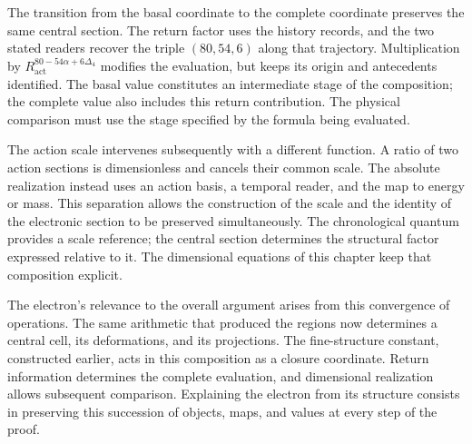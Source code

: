 The transition from the basal coordinate to the complete coordinate preserves
the same central section. The return factor uses the history
records, and the two stated readers recover the triple
$(80,54,6)$ along that trajectory. Multiplication by
$R_{\mathrm{act}}^{80-54\alpha+6\Delta_4}$ modifies the evaluation,
but keeps its origin and antecedents identified. The basal
value constitutes an intermediate stage of the composition; the complete
value also includes this return contribution. The physical
comparison must use the stage specified by the formula being evaluated.

The action scale intervenes subsequently with a different function. A ratio of
two action sections is dimensionless and cancels their common scale.
The absolute realization instead uses an action basis, a
temporal reader, and the map to energy or mass. This separation allows
the construction of the scale and the identity of the electronic section
to be preserved simultaneously. The chronological quantum provides a
scale reference; the central section determines the structural factor
expressed relative to it. The dimensional equations of this
chapter keep that composition explicit.

The electron's relevance to the overall argument arises from this
convergence of operations. The same arithmetic that produced the
regions now determines a central cell, its deformations, and its
projections. The fine-structure constant, constructed earlier, acts
in this composition as a closure coordinate. Return information
determines the complete evaluation, and dimensional realization
allows subsequent comparison. Explaining the electron from its structure
consists in preserving this succession of objects, maps, and values at every
step of the proof.

